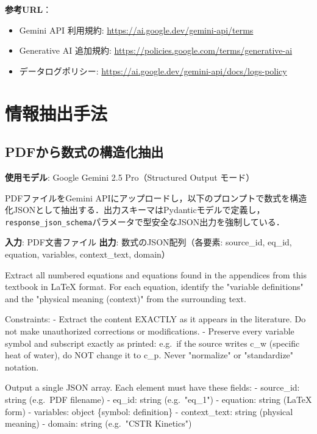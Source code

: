 \documentclass[11pt,a4paper]{ltjsarticle}
\begin{document}
\textbf{参考URL}：
\begin{itemize}[nosep]
  \item Gemini API 利用規約: \url{https://ai.google.dev/gemini-api/terms}
  \item Generative AI 追加規約: \url{https://policies.google.com/terms/generative-ai}
  \item データログポリシー: \url{https://ai.google.dev/gemini-api/docs/logs-policy}
\end{itemize}

\section{情報抽出手法}

\subsection{PDFから数式の構造化抽出}

\textbf{使用モデル}: Google Gemini 2.5 Pro（Structured Output モード）

PDFファイルをGemini APIにアップロードし，以下のプロンプトで数式を構造化JSONとして抽出する．出力スキーマはPydanticモデルで定義し，\texttt{response\_json\_schema}パラメータで型安全なJSON出力を強制している．

\textbf{入力}: PDF文書ファイル \quad
\textbf{出力}: 数式のJSON配列（各要素: source\_id, eq\_id, equation, variables, context\_text, domain）

\begin{promptbox}
Extract all numbered equations and equations found in the appendices
from this textbook in LaTeX format. For each equation, identify the
"variable definitions" and the "physical meaning (context)" from the
surrounding text.

Constraints:
- Extract the content EXACTLY as it appears in the literature.
  Do not make unauthorized corrections or modifications.
- Preserve every variable symbol and subscript exactly as printed:
  e.g.\ if the source writes c\_w (specific heat of water),
  do NOT change it to c\_p.
  Never "normalize" or "standardize" notation.

Output a single JSON array. Each element must have these fields:
- source\_id: string (e.g.\ PDF filename)
- eq\_id: string (e.g.\ "eq\_1")
- equation: string (LaTeX form)
- variables: object \{symbol: definition\}
- context\_text: string (physical meaning)
- domain: string (e.g.\ "CSTR Kinetics")
\end{promptbox}
\end{document}
